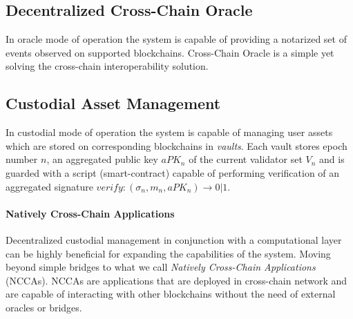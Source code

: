 \documentclass{article}
\begin{document}
    \subsection{Decentralized Cross-Chain Oracle}\label{subsec:cross-chain-oracle}
    In oracle mode of operation the system is capable of providing a notarized set of events observed on supported blockchains.
    Cross-Chain Oracle is a simple yet solving the cross-chain interoperability solution.

    \subsection{Custodial Asset Management}\label{subsec:custodial-asset-management}
    In custodial mode of operation the system is capable of managing user assets which are stored on corresponding blockchains in \emph{vaults}.
    Each vault stores epoch number $n$, an aggregated public key $aPK_n$ of the current validator set $V_n$ and
    is guarded with a script (smart-contract) capable of performing verification of
    an aggregated signature $verify: (\sigma_n, m_n, aPK_n) \rightarrow 0 | 1$.

    \paragraph{Natively Cross-Chain Applications}
    Decentralized custodial management in conjunction with a computational layer can be highly beneficial for expanding the capabilities of the system.
    Moving beyond simple bridges to what we call \emph{Natively Cross-Chain Applications} (NCCAs).
    NCCAs are applications that are deployed in cross-chain network and are capable of interacting with other blockchains without the need of external oracles or bridges.

    \newpage

    \printbibliography
\end{document}

